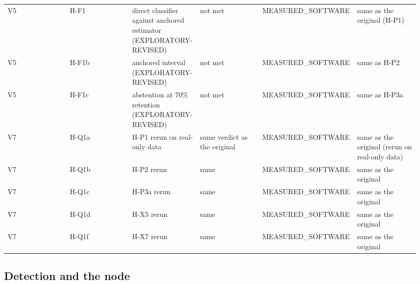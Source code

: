 {\begin{longtable}{p{0.158\linewidth}p{0.158\linewidth}p{0.158\linewidth}p{0.158\linewidth}p{0.158\linewidth}p{0.158\linewidth}}
V5 & H-F1 & direct classifier against anchored estimator (EXPLORATORY-REVISED) & not met & MEASURED\_SOFTWARE & same as the original (H-P1) \\
V5 & H-F1b & anchored interval (EXPLORATORY-REVISED) & not met & MEASURED\_SOFTWARE & same as H-P2 \\
V5 & H-F1c & abstention at 70\% retention (EXPLORATORY-REVISED) & not met & MEASURED\_SOFTWARE & same as H-P3a \\
V7 & H-Q1a & H-P1 rerun on real-only data & same verdict as the original & MEASURED\_SOFTWARE & same as the original (rerun on real-only data) \\
V7 & H-Q1b & H-P2 rerun & same & MEASURED\_SOFTWARE & same as the original \\
V7 & H-Q1c & H-P3a rerun & same & MEASURED\_SOFTWARE & same as the original \\
V7 & H-Q1d & H-X5 rerun & same & MEASURED\_SOFTWARE & same as the original \\
V7 & H-Q1f & H-X7 rerun & same & MEASURED\_SOFTWARE & same as the original \\
\bottomrule
\end{longtable}}

\subsection*{Detection and the node}

